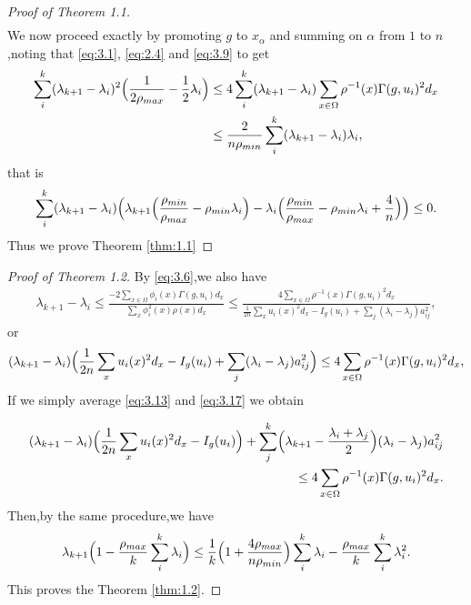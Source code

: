 \documentclass[11pt]{article}
\theoremstyle{definition}
\theoremstyle{remark}
\numberwithin{equation}{section}
\begin{document}
\begin{proof}[Proof of Theorem 1.1]
\begin{align}
\end{align}
We now proceed exactly by promoting $g$ to $x_\alpha$ and summing on $\alpha$ from $1$ to $n$ ,noting that \eqref{eq:3.1}, \eqref{eq:2.4} and \eqref{eq:3.9} to get
\begin{align}
    \sum_{i}^{k}(\lambda_{k+1}-\lambda_i)^2\Bigl(\frac{1}{2\rho_{max}}-\frac{1}{2}\lambda_i\Bigr)&\le 4\sum_{i}^{k}(\lambda_{k+1}-\lambda_i)\sum_{x\in \Omega}\rho^{-1}(x)\Gamma(g,u_i)^2d_x \notag \\
&\le \frac{2}{n\rho_{min}}\sum_{i}^{k}(\lambda_{k+1}-\lambda_i)\lambda_i,
\end{align}
that is
\begin{align*}
\sum_{i}^{k}(\lambda_{k+1}-\lambda_i)\Bigl(\lambda_{k+1}\Bigl(\frac{\rho_{min}}{\rho_{max}}-{\rho_{min}}\lambda_i\Bigr)-\lambda_i\Bigl(\frac{\rho_{min}}{\rho_{max}}-{\rho_{min}}\lambda_i+\frac{4}{n}\Bigr)\Bigr)\le 0.
\end{align*}
Thus we prove Theorem \ref{thm:1.1} \qedhere
\end{proof}
\begin{proof}[Proof of Theorem 1.2]
By \eqref{eq:3.6},we also have
\begin{align}
  \lambda_{k+1}-\lambda_{i}\le \frac{-2\sum_{x\in \Omega}\phi_i(x)\Gamma(g,u_i)d_x}{\sum_{x}\phi_i^2(x)\rho(x)d_x}
    \le \frac{4\sum_{x\in\Omega}\rho^{-1}(x)\Gamma(g,u_i)^2d_x}
    {\frac{1}{2n}\sum_{x}u_i(x)^2d_x-I_g(u_i)+\sum_{j}(\lambda_i-\lambda_j)a_{ij}^2},
\end{align}
or
\begin{align}\label{eq:3.17}
    (\lambda_{k+1}-\lambda_{i})\Bigl(\frac{1}{2n}\sum_{x}u_i(x)^2d_x-I_g(u_i)+\sum_{j}(\lambda_i-\lambda_j)a_{ij}^2\Bigr)\le 4\sum_{x\in\Omega}\rho^{-1}(x)\Gamma(g,u_i)^2d_x,
\end{align}
If we simply average \eqref{eq:3.13} and \eqref{eq:3.17} we obtain

  \begin{align}(\lambda_{k+1}-\lambda_{i})\Bigl(\frac{1}{2n}\sum_{x}u_i(x)^2d_x-I_g(u_i)\Bigr)+\sum_{j}^{k}\Bigl(\lambda_{k+1}-\frac{\lambda_i+\lambda_{j}}{2}\Bigr)(\lambda_i-\lambda_j)a_{ij}^2
    \notag\\\le 4\sum_{x\in \Omega}\rho^{-1}(x)\Gamma(g,u_i)^2d_x.\end{align}
Then,by the same procedure,we have
\begin{align*}
\lambda_{k+1}\Bigl(1-\frac{\rho_{max}}{k}\sum_{i}^{k}\lambda_i\Bigr)\le \frac{1}{k}\Bigl(1+\frac{4\rho_{max}}{n\rho_{min}}\Bigr)\sum_{i}^{k}\lambda_i-\frac{\rho_{max}}{k}\sum_{i}^{k}\lambda_i^2.
\end{align*}
This proves the Theorem \ref{thm:1.2}.
\end{proof}
\end{document}
